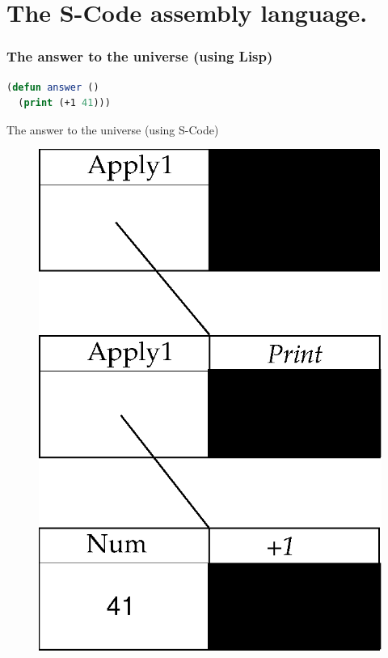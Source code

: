 \documentclass{beamer}
\begin{document}
\section{The S-Code assembly language.}

\begin{frame}[fragile]
\frametitle{The answer to the universe (using Lisp)}
\begin{lstlisting}[language=Lisp]
(defun answer () 
  (print (+1 41)))
\end{lstlisting}
\end{frame}

\begin{frame}{The answer to the universe (using S-Code)}
\begin{figure}[h]
\center
\includegraphics[scale=0.5]{answerscode.eps}
\end{figure}
\end{frame}
\end{document}
